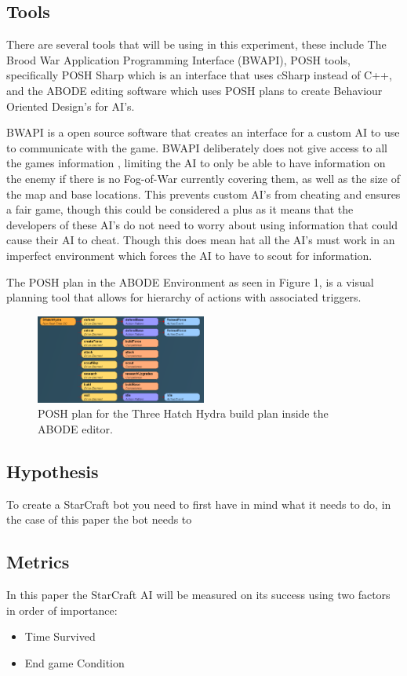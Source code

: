 \documentclass[journal]{IEEEtran}
\begin{document}
\subsection{Tools}
There are several tools that will be using in this experiment, these include The Brood War Application Programming Interface (BWAPI), POSH tools, specifically POSH Sharp which is an interface that uses cSharp instead of C++, and the ABODE editing software which uses POSH plans to create Behaviour Oriented Design's for AI's. 

BWAPI \cite{BWAPI} is a open source software that creates an interface for a custom AI to use to communicate with the game. BWAPI deliberately does not give access to all the games information \cite{POSH}, limiting the AI to only be able to have information on the enemy if there is no Fog-of-War currently covering them, as well as the size of the map and base locations. This prevents custom AI's from cheating and ensures a fair game, though this could be considered a plus as it means that the developers of these AI's do not need to worry about using information that could cause their AI to cheat. Though this does mean hat all the AI's must work in an imperfect environment which forces the AI to have to scout for information.

The POSH plan in the ABODE Environment as seen in Figure 1, is a visual planning tool that allows for hierarchy of actions with associated triggers.

\begin{figure}[h]
	\centering
	\includegraphics[width=0.5\textwidth]{POSH}
	\caption{POSH plan for the Three Hatch Hydra build plan inside the ABODE editor.}
	\label{fig:mesh1}
\end{figure}
\newpage

\subsection{Hypothesis}

To create a StarCraft bot you need to first have in mind what it needs to do, in the case of this paper the bot needs to 

\subsection{Metrics}
In this paper the StarCraft AI will be measured on its success using two factors in order of importance:
\begin{itemize}
	\item[] \centering Time Survived
	\item[] End game Condition
\end{itemize}
\end{document}
